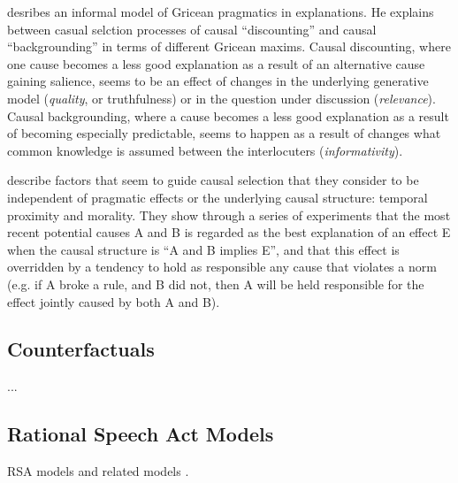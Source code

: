\documentclass[10pt,letterpaper]{article}
\begin{document}
 desribes an informal model of Gricean pragmatics in explanations.
He explains between casual selction processes of causal ``discounting'' and causal ``backgrounding'' in terms of different Gricean maxims.
Causal discounting, where one cause becomes a less good explanation as a result of an alternative cause gaining salience, seems to be an effect of changes in the underlying generative model (\emph{quality}, or truthfulness) or in the question under discussion (\emph{relevance}).
Causal backgrounding, where a cause becomes a less good explanation as a result of becoming especially predictable, seems to happen as a result of changes what common knowledge is assumed between the interlocuters (\emph{informativity}).

 describe factors that seem to guide causal selection that they consider to be independent of pragmatic effects or the underlying causal structure: temporal proximity and morality. They show through a series of experiments that the most recent potential causes A and B is regarded as the best explanation of an effect E when the causal structure is ``A and B implies E'', and that this effect is overridden by a tendency to hold as responsible any cause that violates a norm (e.g. if A broke a rule, and B did not, then A will be held responsible for the effect jointly caused by both A and B).

\subsection{Counterfactuals}

 ...

\subsection{Rational Speech Act Models}

RSA models \cite{FrankGoodman2012, GoodmanStuhlmuller2013} and related models \cite{Franke2011, Russell2012}.



\setlength{\bibleftmargin}{.125in}
\setlength{\bibindent}{-\bibleftmargin}


\end{document}
